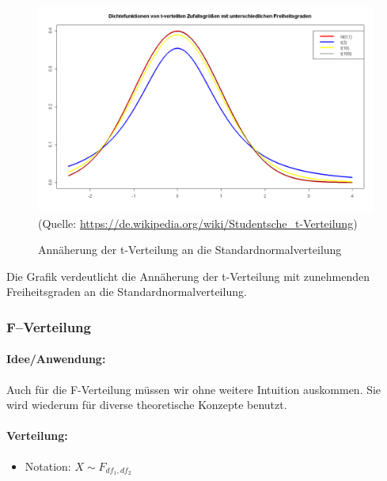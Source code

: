 \documentclass[a4paper]{article}
\begin{document}
\begin{figure}[htbp] 
\caption{Annäherung der t-Verteilung an die Standardnormalverteilung}\label{Fig:a}
\centering
\includegraphics[scale=0.3]{figures/T-distribution.png}
\footnotesize{(Quelle: \url{https://de.wikipedia.org/wiki/Studentsche_t-Verteilung})}
\end{figure}

\noindent Die Grafik verdeutlicht die Annäherung der t-Verteilung mit zunehmenden Freiheitsgraden an die Standardnormalverteilung.\\

\noindent {}

\subsubsection{F--Verteilung}\label{sec:fdistr}

\paragraph{Idee/Anwendung:} Auch für die F-Verteilung müssen wir ohne weitere Intuition auskommen. Sie wird wiederum für diverse theoretische Konzepte benutzt. 

\paragraph{Verteilung:}
\begin{itemize}
\item[] Notation: $X \sim F_{df_1,df_2}$
\end{itemize}
\end{document}
